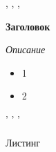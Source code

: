 


\tableofcontents


\newpage
\Chapter{\lab\ \labnumber}{\labtheme}{}

\begin{center}
, , ,
\end{center}
\noindent
\textbf{
   Заголовок
}

\textit{
    Описание
}

\begin{itemize}
    \setlength{\itemsep}{0pt} %
    \setlength{\parskip}{0pt}
    \setlength{\parsep}{0pt} 
    \item 1
    \item 2
\end{itemize}

\begin{center}
    ' ' '
\end{center}

\newpage
{}
Листинг



\newpage





